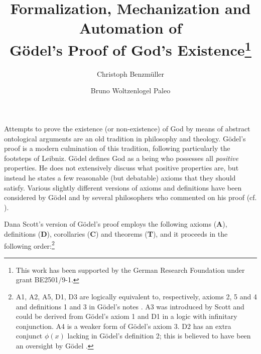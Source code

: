 \documentclass{llncs}
\title{Formalization, Mechanization and Automation %
  of \\ G\"{o}del's Proof of God's Existence\thanks{This work has been
    supported by the German Research Foundation under grant
    BE2501/9-1.}}
\author{
  Christoph Benzm\"{u}ller\inst{1} 
  \and 
  Bruno Woltzenlogel Paleo\inst{2}
}
\institute{
  Dahlem Center for Intelligent Systems, Freie Universit\"{a}t Berlin, Germany\\
  \email{c.benzmueller@gmail.com}
  \and 
  Theory and Logic Group, Vienna University of Technology, Austria \\
  \email{bruno@logic.at}
}
\begin{document}
\maketitle

Attempts to prove the existence (or non-existence) of God by means of
abstract ontological arguments are an old tradition in philosophy and
theology.  G\"{o}del's proof \cite{Goedel1970,GoedelNotes} is a modern culmination of
this tradition, following particularly the footsteps of Leibniz.
%
G\"{o}del defines God as a being who possesses all \emph{positive} properties.
He does not extensively discuss what positive properties are, 
but instead he states a few reasonable (but debatable) axioms that they should satisfy.
Various slightly different versions of axioms and definitions have
been considered by G\"{o}del and by several philosophers who commented
on his proof
(cf. \cite{sobel2004logic,AndersonGettings,Fitting,Adams,ContemporaryBibliography}). 

Dana Scott's version of G\"odel's proof \cite{ScottNotes} employs the
following axioms (\textbf{A}), definitions (\textbf{D}), corollaries
(\textbf{C}) and theorems (\textbf{T}), and it proceeds in the
following order:\footnote{ A1, A2, A5, D1, D3 are logically
  equivalent to, respectively, axioms 2, 5 and 4 and definitions 1 and
  3 in G\"odel's notes \cite{Goedel1970,GoedelNotes}. 
  A3 was introduced by Scott \cite{ScottNotes} and 
  could be derived from G\"odel's axiom 1 and
  D1 in a logic with infinitary conjunction. 
  A4 is a weaker form of G\"odel's axiom 3. 
  D2 has an extra conjunct $\phi(x)$ lacking in G\"odel's definition 2; 
  this is believed to have been 
  an oversight by G\"odel \cite{Hazen}.}
\end{document}
